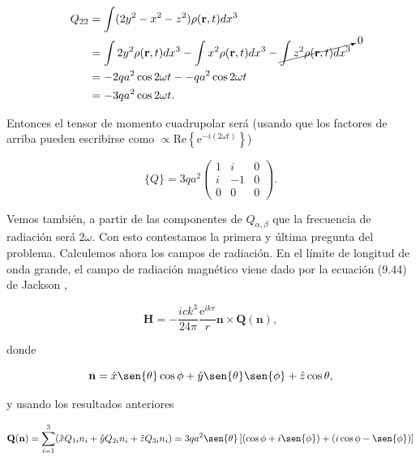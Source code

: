 \documentclass[a4paper,11pt]{article}
\numberwithin{equation}{section}
\newcommand{\euler}{\mathrm{e}}
\begin{document}
\begin{align*}
 Q_{22} &= \int (2y^2 - x^2 - z^2)\rho(\mathbf{r},t) dx^3 \\
 &= \int 2 y^2 \rho(\mathbf{r},t) dx^3 
 - \int x^2 \rho(\mathbf{r},t) dx^3 - \cancelto{0}{\int z^2\rho(\mathbf{r},t) dx^3} \\
 &= - 2 q a^2 \cos{2\omega t} - - q a^2 \cos{2\omega t}\\
 &= - 3 q a^2 \cos{2\omega t}.
\end{align*}

Entonces el tensor de momento cuadrupolar será (usando que los factores de arriba 
pueden escribirse como $\propto \text{Re}\left\{\euler^{-i(2\omega t)}\right\}$)

\begin{equation}
 \{ Q \} = 3qa^2 \begin{pmatrix}
                  1 & i & 0 \\
                  i & -1 & 0 \\
                  0 & 0 & 0
                 \end{pmatrix}.
\end{equation}

Vemos también, a partir de las componentes de $Q_{\alpha,\beta}$ que 
la frecuencia de radiación será $2\omega$. Con esto contestamos la primera y 
última pregunta del problema. Calculemos ahora los campos de radiación. En el límite 
de longitud de onda grande, el campo de radiación magnético viene dado por la 
ecuación (9.44) de Jackson \cite{jackson}, 

\begin{equation}
 \mathbf{H} = - \frac{ick^3}{24\pi}\frac{\euler^{ikr}}{r} \mathbf{n} \times 
 \mathbf{Q}(\mathbf{n}), 
\end{equation}

donde 

\begin{equation}
 \mathbf{n} = \hat{x} \sen{\theta}\cos{\phi} + \hat{y} \sen{\theta}\sen{\phi} 
 + \hat{z} \cos{\theta},
\end{equation}

y usando los resultados anteriores

\begin{equation*}
 \mathbf{Q}(\mathbf{n}) = \sum_{i=1}^3 (\hat{x}Q_{1i} n_i + \hat{y}Q_{2i} n_i + 
 \hat{z}Q_{3i} n_i) = 3qa^2\sen{\theta}\left[(\cos{\phi} + i \sen{\phi}) 
 + (i\cos{\phi} - \sen{\phi})\right]
\end{equation*}
\end{document}
